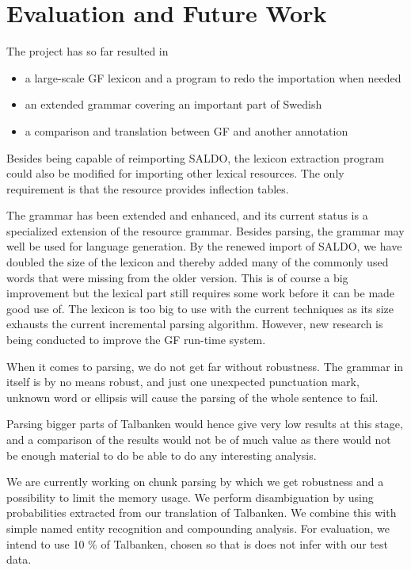 \documentclass[10pt, a4paper]{article}
\begin{document}
\section{Evaluation and Future Work}
The project has so far resulted in
\begin{itemize}
\item a large-scale GF lexicon and a program to redo the importation when needed
\item an extended grammar covering an important part of Swedish
\item a comparison and translation between GF and another annotation
\end{itemize}

Besides being capable of reimporting SALDO, the lexicon extraction program could also
be modified for importing other lexical resources. The only requirement is that
the resource provides inflection tables.

The grammar has been extended and enhanced, and its current status is
a specialized extension of the resource grammar.
Besides parsing, the grammar may well be used for language generation.
By the renewed import of SALDO, we have doubled the size of the lexicon and thereby
added many of the commonly used words that were missing from the older
version. This is of course a big improvement
but the lexical part still requires some work before it can be made good use of.
The lexicon is too big to use with the current techniques as its size exhausts the
current incremental parsing algorithm. However, new research is being conducted
to improve the GF run-time system.

When it comes to parsing, we do not get far without robustness.
The grammar in itself is by no means robust, and just one 
unexpected punctuation mark, unknown word
or ellipsis will cause the parsing of the whole sentence to fail. 

Parsing bigger parts of Talbanken would hence give very low results at this stage, 
and a comparison of the results would not be of much value as
there would not be enough material
to do be able to do any interesting analysis.

We are currently working on chunk parsing by which we get robustness and a possibility
to limit the memory usage. We perform disambiguation by using probabilities
extracted from our translation of Talbanken. We combine this with simple named
entity recognition and compounding analysis. For evaluation, we intend to use
10 \% of Talbanken, chosen so that is does not infer with our test data.
\end{document}
